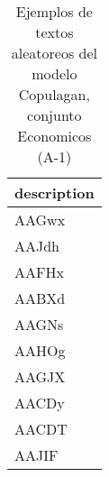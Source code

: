 \begin{table}[H]
\centering
\fontsize{8}{14}\selectfont
\caption{Ejemplos de textos aleatoreos del modelo Copulagan, conjunto Economicos (A-1)}
\label{table-sample10-economicos-a-1-copulagan-text}
\begin{tabular}{|m{50em}|}
\hline
\rowcolor[gray]{0.8}
description \\
\hline AAGwx \\
\hline AAJdh \\
\hline AAFHx \\
\hline AABXd \\
\hline AAGNs \\
\hline AAHOg \\
\hline AAGJX \\
\hline AACDy \\
\hline AACDT \\
\hline AAJIF \\
\hline
\end{tabular}
\end{table}
